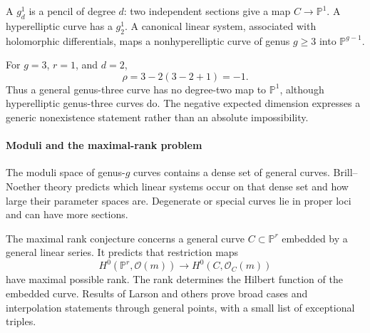 A $g^1_d$ is a pencil of degree $d$: two independent sections give a map $C\to\mathbb P^1$. A hyperelliptic curve has a $g^1_2$. A canonical linear system, associated with holomorphic differentials, maps a nonhyperelliptic curve of genus $g\geq3$ into $\mathbb P^{g-1}$.

For $g=3$, $r=1$, and $d=2$,
\[
 \rho=3-2(3-2+1)=-1.
\]
Thus a general genus-three curve has no degree-two map to $\mathbb P^1$, although hyperelliptic genus-three curves do. The negative expected dimension expresses a generic nonexistence statement rather than an absolute impossibility.

\paragraph{Moduli and the maximal-rank problem}

The moduli space of genus-$g$ curves contains a dense set of general curves. Brill--Noether theory predicts which linear systems occur on that dense set and how large their parameter spaces are. Degenerate or special curves lie in proper loci and can have more sections.

The maximal rank conjecture concerns a general curve $C\subset\mathbb P^r$ embedded by a general linear series. It predicts that restriction maps
\[
 H^0(\mathbb P^r,\mathcal O(m))\to H^0(C,\mathcal O_C(m))
\]
have maximal possible rank. The rank determines the Hilbert function of the embedded curve. Results of Larson and others prove broad cases and interpolation statements through general points, with a small list of exceptional triples.

